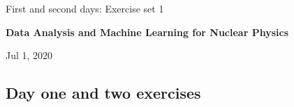 \documentclass[%
oneside,                 %
final,                   %
10pt]{article}
\begin{document}

\newcommand{\exercisesection}[1]{\subsection*{#1}}






\thispagestyle{empty}

\begin{center}
{\LARGE\bf
\begin{spacing}{1.25}
First and second days: Exercise set 1
\end{spacing}
}
\end{center}


\begin{center}
{\bf Data Analysis and Machine Learning for Nuclear Physics${}^{}$} \\ [0mm]
\end{center}

\begin{center}
\end{center}
    

\begin{center}
Jul 1, 2020
\end{center}

\vspace{1cm}


\subsection{Day one and two  exercises}
\end{document}
